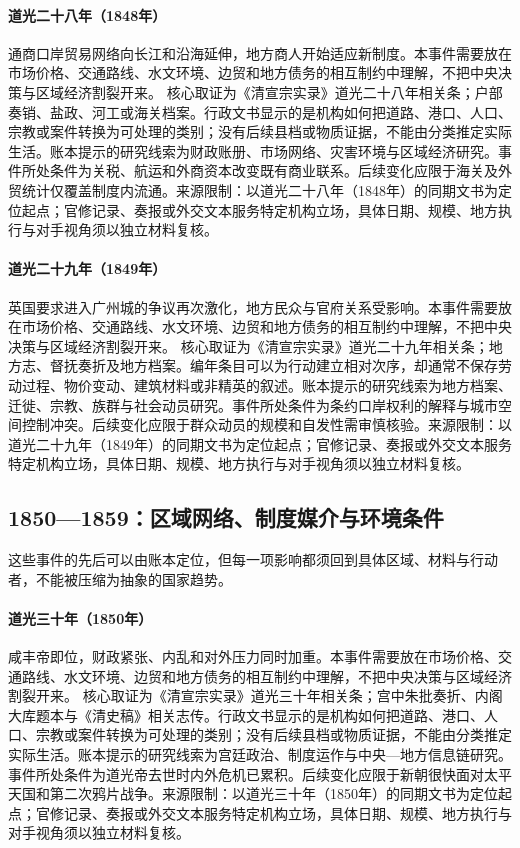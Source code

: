 \hypertarget{civic:EQ-1848-YANGTZE-TRADE}{}\paragraph{道光二十八年（1848年）}通商口岸贸易网络向长江和沿海延伸，地方商人开始适应新制度。本事件需要放在市场价格、交通路线、水文环境、边贸和地方债务的相互制约中理解，不把中央决策与区域经济割裂开来。 核心取证为《清宣宗实录》道光二十八年相关条；户部奏销、盐政、河工或海关档案。行政文书显示的是机构如何把道路、港口、人口、宗教或案件转换为可处理的类别；没有后续县档或物质证据，不能由分类推定实际生活。账本提示的研究线索为财政账册、市场网络、灾害环境与区域经济研究。事件所处条件为关税、航运和外商资本改变既有商业联系。后续变化应限于海关及外贸统计仅覆盖制度内流通。来源限制：以道光二十八年（1848年）的同期文书为定位起点；官修记录、奏报或外交文本服务特定机构立场，具体日期、规模、地方执行与对手视角须以独立材料复核。
\hypertarget{civic:EQ-1849-GUANGZHOU-CITY-ENTRY}{}\paragraph{道光二十九年（1849年）}英国要求进入广州城的争议再次激化，地方民众与官府关系受影响。本事件需要放在市场价格、交通路线、水文环境、边贸和地方债务的相互制约中理解，不把中央决策与区域经济割裂开来。 核心取证为《清宣宗实录》道光二十九年相关条；地方志、督抚奏折及地方档案。编年条目可以为行动建立相对次序，却通常不保存劳动过程、物价变动、建筑材料或非精英的叙述。账本提示的研究线索为地方档案、迁徙、宗教、族群与社会动员研究。事件所处条件为条约口岸权利的解释与城市空间控制冲突。后续变化应限于群众动员的规模和自发性需审慎核验。来源限制：以道光二十九年（1849年）的同期文书为定位起点；官修记录、奏报或外交文本服务特定机构立场，具体日期、规模、地方执行与对手视角须以独立材料复核。
\subsection{1850—1859：区域网络、制度媒介与环境条件}
这些事件的先后可以由账本定位，但每一项影响都须回到具体区域、材料与行动者，不能被压缩为抽象的国家趋势。
\hypertarget{civic:EQ-1850-XIANFENG-ACCESSION}{}\paragraph{道光三十年（1850年）}咸丰帝即位，财政紧张、内乱和对外压力同时加重。本事件需要放在市场价格、交通路线、水文环境、边贸和地方债务的相互制约中理解，不把中央决策与区域经济割裂开来。 核心取证为《清宣宗实录》道光三十年相关条；宫中朱批奏折、内阁大库题本与《清史稿》相关志传。行政文书显示的是机构如何把道路、港口、人口、宗教或案件转换为可处理的类别；没有后续县档或物质证据，不能由分类推定实际生活。账本提示的研究线索为宫廷政治、制度运作与中央—地方信息链研究。事件所处条件为道光帝去世时内外危机已累积。后续变化应限于新朝很快面对太平天国和第二次鸦片战争。来源限制：以道光三十年（1850年）的同期文书为定位起点；官修记录、奏报或外交文本服务特定机构立场，具体日期、规模、地方执行与对手视角须以独立材料复核。
